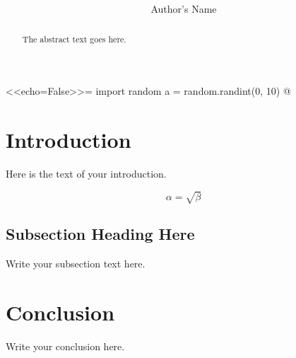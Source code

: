 \documentclass[12pt]{article}
\begin{document}
<<echo=False>>=
import random
a = random.randint(0, 10)
@

\title{ }
\author{Author's Name}

\maketitle

\begin{abstract}
The abstract text goes here.
\end{abstract}

\section{Introduction}
Here is the text of your introduction.

\begin{equation}
    \label{simple_equation}
    \alpha = \sqrt{ \beta }
\end{equation}

\subsection{Subsection Heading Here}
Write your subsection text here.

\section{Conclusion}
Write your conclusion here.

\end{document}
